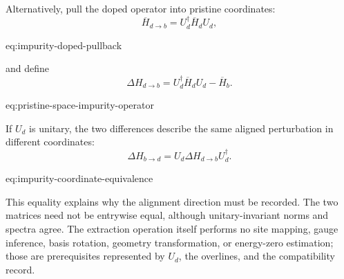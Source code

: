 Alternatively, pull the doped operator into pristine coordinates:
\begin{equation}
    \overline H_{d\to b}
    =
    U_d^{\dagger}\overline H_dU_d,
    \label{eq:impurity-doped-pullback}
\end{equation}
\begin{equationterms}{eq:impurity-doped-pullback}
\end{equationterms}
and define
\begin{equation}
    \boxed{
    \Delta H_{d\to b}
    =
    U_d^{\dagger}\overline H_dU_d
    -
    \overline H_b}
    .
    \label{eq:pristine-space-impurity-operator}
\end{equation}
\begin{equationterms}{eq:pristine-space-impurity-operator}
\end{equationterms}
If $U_d$ is unitary, the two differences describe the same aligned perturbation
in different coordinates:
\begin{equation}
    \Delta H_{b\to d}
    =
    U_d\Delta H_{d\to b}U_d^{\dagger}.
    \label{eq:impurity-coordinate-equivalence}
\end{equation}
\begin{equationterms}{eq:impurity-coordinate-equivalence}
\end{equationterms}
This equality explains why the alignment direction must be recorded. The two
matrices need not be entrywise equal, although unitary-invariant norms and
spectra agree. The extraction operation itself performs no site mapping, gauge
inference, basis rotation, geometry transformation, or energy-zero estimation;
those are prerequisites represented by $U_d$, the overlines, and the
compatibility record.

